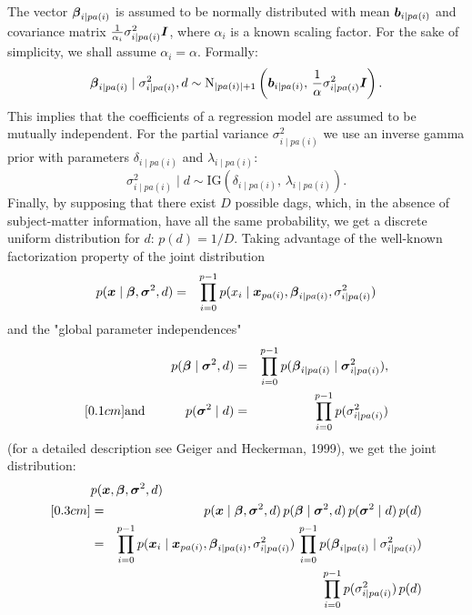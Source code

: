 The vector $\mbox{\boldmath $\beta$}_{i \mid pa(i)}$ is assumed to be normally
distributed with mean $\mbox{\boldmath $b$}_{i \mid pa(i)}$ and covariance matrix $
\frac{1}{\alpha_i} \sigma_{i \mid pa(i)}^2 \mbox{\boldmath $I$} $, where $\alpha_i$
is a known scaling factor. For the sake of simplicity, we shall
assume $\alpha_i=\alpha$. Formally:
%
$$\mbox{\boldmath $\beta$}_{i \mid pa(i)} \mid \sigma_{i \mid pa(i)}^2, d   \sim
\mbox{N}_{|pa(i)|+1} \left ( \mbox{\boldmath $b$}_{i \mid pa(i)}, \,\frac{1}{\alpha}
\sigma_{i \mid pa(i)}^2 \mbox{\boldmath $I$}  \right ).$$
%
This implies that the coefficients of a regression model are
assumed to be mutually independent. For the partial variance
$\sigma_{i \mid pa(i)}^2$ we use an inverse gamma prior with
parameters $\delta_{i \mid pa(i)}$ and $\lambda_{i \mid pa(i)}$:
%
$$\sigma_{i \mid pa(i)}^2 \mid  d \sim \mbox{IG} \left ( \delta_{i
\mid pa(i)}, \,\lambda_{i \mid pa(i)} \right).$$
%
Finally, by supposing that there exist $D$ possible dags, which,
in the absence of subject-matter information, have all the same
probability, we get a discrete uniform distribution for $d$: $p(d)
=  1/D.$ Taking advantage of the well-known factorization property
of the joint distribution
\begin{eqnarray}
p(\mbox{\boldmath $x$} \mid \mbox{\boldmath $\beta$}, \mbox{\boldmath $\sigma$}^2, d) &=&  \prod_{i=0}^{p-1} p(x_i \mid
\mbox{\boldmath $x$}_{pa(i)}, \mbox{\boldmath $\beta$}_{i \mid pa(i)}, \sigma_{i\mid pa(i)}^2)
\nonumber
\end{eqnarray}
and the "global parameter independences"
\begin{eqnarray}
p(\mbox{\boldmath $\beta$} \mid  \mbox{\boldmath $\sigma$}^2, d) &=& \prod_{i=0}^{p-1} p(\mbox{\boldmath $\beta$}_{i
\mid pa(i)} \mid \mbox{\boldmath $\sigma$}_{i \mid pa(i)}^2),  \nonumber \\ [0.1cm]
\mbox{and \hspace{1cm}} p( \mbox{\boldmath $\sigma$}^2 \mid d) &=& \prod_{i=0}^{p-1}
p(\sigma_{i \mid pa(i)}^2) \nonumber
\end{eqnarray}
(for a detailed description see Geiger and Heckerman, 1999), we
get the joint distribution:
%
\begin{eqnarray}
\lefteqn{ p(\x, \mbeta, \msigma^2, d)  }  \nonumber \\  [0.3cm]
&=&   p(\x \mid \mbeta, \msigma^2, d) \,p(\mbeta \mid \msigma^2, d)  \, p( \msigma^2 \mid d)  \, p(d) \nonumber\\
&=&    \prod_{i=0}^{p-1} p( \x_i \mid \x_{pa(i)}, \mbeta_{i \mid
pa(i)}, \sigma^2_{i \mid pa(i)})
    \, \prod_{i=0}^{p-1} p(\mbeta_{i \mid pa(i)} \mid \sigma_{i \mid pa(i)}^2)  \nonumber  \\
& &  \, \prod_{i=0}^{p-1} p(\sigma_{i \mid pa(i)}^2) \, p(d)
\nonumber
\end{eqnarray}

